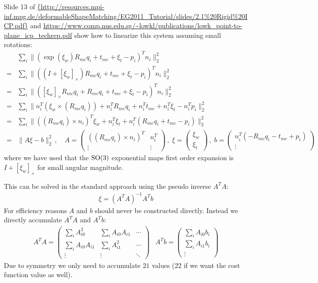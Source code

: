 Slide 13 of 
\url{{http://resources.mpi-inf.mpg.de/deformableShapeMatching/EG2011_Tutorial/slides/2.1%
\url{https://www.comp.nus.edu.sg/~lowkl/publications/lowk_point-to-plane_icp_techrep.pdf}
show how to linearize this system assuming small rotations:
\begin{align}
  &\sum_i \| (  \exp(\xi_w) R_{mc} q_i + t_{mc} + \xi_t - p_i )^T n_i \|^2_2 \\
  =& \sum_i \| ( (I + [\xi_w]_\times) R_{mc} q_i + t_{mc} + \xi_t - p_i )^T n_i \|^2_2\\
  =& \sum_i \| (  [\xi_w]_\times R_{mc} q_i + R_{mc} q_i + t_{mc} + \xi_t - p_i )^T n_i \|^2_2\\
  =& \sum_i \| n_i^T (\xi_w \times (R_{mc} q_i)) + n_i^T R_{mc} q_i + n_i^T t_{mc} + n_i^T \xi_t -n_i^T p_i \|^2_2\\
  =& \sum_i \|  ( (R_{mc} q_i) \times n_i)^T \xi_w + n_i^T \xi_t + n_i^T ( R_{mc} q_i + t_{mc} - p_i) \|^2_2\\
  =& \|  A \xi - b \|^2_2  \,,\quad
  A = \begin{pmatrix}
    ((R_{mc} q_i) \times n_i)^T &  n_i^T \\
    \vdots & \vdots
  \end{pmatrix}\,,\;
  \xi = \begin{pmatrix} \xi_w \\ \xi_t \end{pmatrix}\,,\;
  b = \begin{pmatrix}
    n_i^T ( - R_{mc} q_i - t_{mc} + p_i) \\
    \vdots
  \end{pmatrix}
\end{align}
where we have used that the $\mathrm{SO(3)}$ exponential maps first order
expansion is $I + [\xi_w]_\times$ for small angular magnitude.

This can be solved in the standard approach using the pseudo inverse $A^TA$:
\begin{align}
  \xi = (A^TA)^{-1} A^Tb
\end{align}
For efficiency reasons $A$ and $b$ should never be constructed
directly. Instead we directly accumulate $A^TA$ and $A^Tb$:
\begin{align}
  A^TA = \begin{pmatrix}
    \sum_i A_{i0}^2 & \sum_i A_{i0} A_{i1} & \cdots \\
    \sum_i A_{i0} A_{i1} & \sum_i A_{i1}^2 & \cdots \\
      \vdots & \vdots & \ddots 
  \end{pmatrix}
  & 
  A^Tb = \begin{pmatrix}
    \sum_i A_{i0} b_{i} \\
    \sum_i A_{i1} b_{i} \\
      \vdots 
  \end{pmatrix}
\end{align}
Due to symmetry we only need to accumulate $21$ values ($22$ if we want
the cost function value as well).

